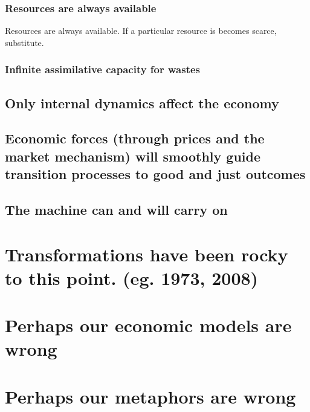 \subsubsection{Resources are always available}
\label{sec:infinite_resources}

Resources are always available.  If a particular resource is becomes scarce, substitute.

\subsubsection{Infinite assimilative capacity for wastes}
\label{sec:infinite_waste}

\subsection{Only internal dynamics affect the economy}
\label{sec:internal_dynamics}

\subsection{Economic forces (through prices and the market mechanism) will smoothly guide transition processes to good and just outcomes}
\label{sec:economic_forces}

\subsection{The machine can and will carry on}
\label{sec:machine_endures}

\section{Transformations have been rocky to this point. (eg. 1973, 2008)}
\label{sec:transformations}

\section{Perhaps our economic models are wrong}
\label{sec:wrong_models}

\section{Perhaps our metaphors are wrong}
\label{sec:wrong_metaphors}

